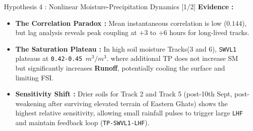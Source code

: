 \documentclass[8pt, aspectratio=169]{beamer}
\begin{document}
\begin{frame}{Hypothesis 4 : Nonlinear Moisture-Precipitation Dynamics [1/2]}
    \vspace{0.2cm}
    \footnotesize
    \textbf{Evidence :}
    \begin{itemize}
        \item \textbf{The Correlation Paradox :} Mean instantaneous correlation is low ($0.144$), but lag analysis reveals peak coupling at $+3$ to $+6$ hours for long-lived tracks.
        \item \textbf{The Saturation Plateau :} In high soil moisture Tracks(3 and 6), \texttt{SWVL1} plateaus at \texttt{0.42-0.45 $m^3/m^3$}. where additional TP does not increase SM but significantly increases \textbf{Runoff}, potentially cooling the surface and limiting FSI. \cite{clapp1978empirical}
        \item \textbf{Sensitivity Shift :} Drier soils for Track 2 and Track 5 (post-10th Sept, post-weakening after surviving elevated terrain of Eastern Ghats) shows the highest relative sensitivity, allowing small rainfall pulses to trigger large \texttt{LHF} and maintain feedback loop (\texttt{TP-SWVL1-LHF}). \cite{hunt2017effect}
    \end{itemize}
\end{frame}
\end{document}
